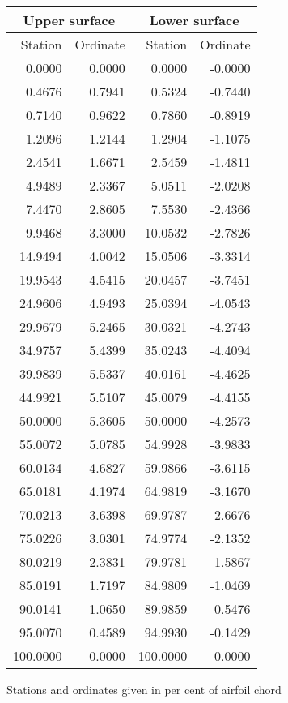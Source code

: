 \documentclass[11pt]{book}
\begin{document}
 \hspace{4mm}
 \begin{tabular}{|r|r|r|r|} \hline 
 \multicolumn{2}{|c|}{Upper surface} & \multicolumn{2}{|c|}{Lower surface} \\
 \hline
 Station & Ordinate & Station & Ordinate \\
 \hline
0.0000 & 0.0000 & 0.0000 & -0.0000 \\
0.4676 & 0.7941 & 0.5324 & -0.7440 \\
0.7140 & 0.9622 & 0.7860 & -0.8919 \\
1.2096 & 1.2144 & 1.2904 & -1.1075 \\
2.4541 & 1.6671 & 2.5459 & -1.4811 \\
4.9489 & 2.3367 & 5.0511 & -2.0208 \\
7.4470 & 2.8605 & 7.5530 & -2.4366 \\
9.9468 & 3.3000 & 10.0532 & -2.7826 \\
14.9494 & 4.0042 & 15.0506 & -3.3314 \\
19.9543 & 4.5415 & 20.0457 & -3.7451 \\
24.9606 & 4.9493 & 25.0394 & -4.0543 \\
29.9679 & 5.2465 & 30.0321 & -4.2743 \\
34.9757 & 5.4399 & 35.0243 & -4.4094 \\
39.9839 & 5.5337 & 40.0161 & -4.4625 \\
44.9921 & 5.5107 & 45.0079 & -4.4155 \\
50.0000 & 5.3605 & 50.0000 & -4.2573 \\
55.0072 & 5.0785 & 54.9928 & -3.9833 \\
60.0134 & 4.6827 & 59.9866 & -3.6115 \\
65.0181 & 4.1974 & 64.9819 & -3.1670 \\
70.0213 & 3.6398 & 69.9787 & -2.6676 \\
75.0226 & 3.0301 & 74.9774 & -2.1352 \\
80.0219 & 2.3831 & 79.9781 & -1.5867 \\
85.0191 & 1.7197 & 84.9809 & -1.0469 \\
90.0141 & 1.0650 & 89.9859 & -0.5476 \\
95.0070 & 0.4589 & 94.9930 & -0.1429 \\
100.0000 & 0.0000 & 100.0000 & -0.0000 \\
 \hline 
 \end{tabular}
 \vspace{8mm}

Stations and ordinates given in per cent of airfoil chord
\end{document}
